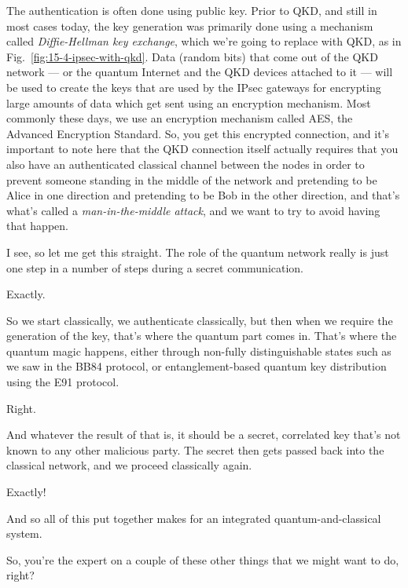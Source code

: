 \rrr The authentication is often done using public key. Prior to QKD, and still in most cases today, the key generation was primarily done using a mechanism called \emph{Diffie-Hellman key exchange}, which we're going to replace with QKD, as in Fig.~\ref{fig:15-4-ipsec-with-qkd}. Data (random bits) that come out of the QKD network --- or the quantum Internet and the QKD devices attached to it --- will be used to create the keys that are used by the IPsec gateways for encrypting large amounts of data which get sent using an encryption mechanism. Most commonly these days, we use an encryption mechanism called AES, the Advanced Encryption Standard. So, you get this encrypted connection, and it's important to note here that the QKD connection itself actually requires that you also have an authenticated classical channel between the nodes in order to prevent someone standing in the middle of the network and pretending to be Alice in one direction and pretending to be Bob in the other direction, and that's what's called a \emph{man-in-the-middle attack}, and we want to try to avoid having that happen.

\mmm I see, so let me get this straight. The role of the quantum network really is just one step in a number of steps during a secret communication.

\rrr Exactly.

\mmm So we start classically, we authenticate classically, but then when we require the generation of the key, that's where the quantum part comes in. That's where the quantum magic happens, either through non-fully distinguishable states such as we saw in the BB84 protocol, or entanglement-based quantum key distribution using the E91 protocol.

\rrr Right.

\mmm And whatever the result of that is, it should be a secret, correlated key that's not known to any other malicious party.  The secret then gets passed back into the classical network, and we proceed classically again.

\rrr Exactly!

And so all of this put together makes for an integrated quantum-and-classical system.

So, you're the expert on a couple of these other things that we might want to do, right?

